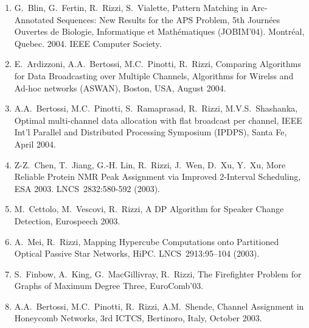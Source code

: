 \documentclass[11pt]{article}
\begin{document}
\begin{enumerate}
\vspace{-1.8mm}
  \item {G.~Blin, G.~Fertin, R.~Rizzi, S.~Vialette},
   \newblock Pattern Matching in Arc-Annotated Sequences: New Results for the APS Problem,
   \newblock 5th Journ\'ees Ouvertes de Biologie, Informatique et Math\'ematiques (JOBIM'04).
   \newblock Montr\'eal, Quebec. 2004.
   \newblock IEEE Computer Society.

\vspace{-1.8mm}
  \item {E.~Ardizzoni, A.A.~Bertossi, M.C.~Pinotti, R.~Rizzi},
   \newblock Comparing Algorithms for Data Broadcasting over Multiple Channels,
   \newblock Algorithms for Wirelss and Ad-hoc networks (ASWAN),
   \newblock Boston, USA, August 2004.

\vspace{-1.8mm}
  \item {A.A.~Bertossi, M.C.~Pinotti, S.~Ramaprasad, R.~Rizzi, M.V.S.~Shashanka},
   \newblock Optimal multi-channel data allocation with flat broadcast per channel,
   \newblock IEEE Int’l Parallel and Distributed Processing Symposium (IPDPS),
   \newblock Santa Fe, April 2004.

\vspace{-1.8mm}
  \item {Z-Z.~Chen, T.~Jiang, G.-H. Lin, R.~Rizzi, J.~Wen, D.~Xu, Y.~Xu},
   \newblock More Reliable Protein NMR Peak Assignment via Improved 2-Interval Scheduling,
   \newblock ESA 2003.
   \newblock LNCS~2832:580-592 (2003).

\vspace{-1.8mm}
  \item {M.~Cettolo, M.~Vescovi, R.~Rizzi},
   \newblock  A DP Algorithm  for Speaker Change Detection,
   \newblock Eurospeech 2003.

\vspace{-1.8mm}
  \item {A.~Mei, R.~Rizzi},
   \newblock Mapping Hypercube Computations onto Partitioned Optical Passive Star Networks,
   \newblock HiPC.
   \newblock  LNCS~2913:95--104 (2003).

\vspace{-1.8mm}
  \item {S.~Finbow, A.~King, G.~MacGillivray, R.~Rizzi},
   \newblock The Firefighter Problem for Graphs of Maximum Degree Three,
   \newblock EuroComb'03.

\vspace{-1.8mm}
  \item {A.A.~Bertossi, M.C.~Pinotti, R.~Rizzi, A.M.~Shende},
   \newblock Channel Assignment in Honeycomb Networks,
   \newblock 3rd ICTCS,
   \newblock Bertinoro, Italy, October 2003.


\end{enumerate}
\end{document}
